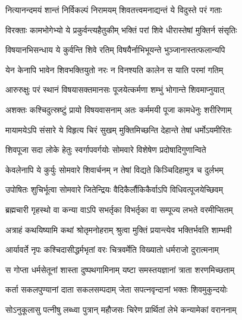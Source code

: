 \label{sec:somvara_vratha_katha}

\begin{center}


\twolineshloka
{नित्यानन्दमयं शान्तं निर्विकल्पं निरामयम्}
{शिवतत्त्वमनाद्यन्तं ये विदुस्ते परं गताः} %

\twolineshloka
{विरक्ताः कामभोगेभ्यो ये प्रकुर्वन्त्यहैतुकीम्}
{भक्तिं परां शिवे धीरास्तेषां मुक्तिर्न संसृतिः} %

\twolineshloka
{विषयानभिसन्धाय ये कुर्वन्ति शिवे रतिम्}
{विषयैर्नाभिभूयन्ते भुञ्जानास्तत्फलान्यपि} %

\twolineshloka
{येन केनापि भावेन शिवभक्तियुतो नरः}
{न विनश्यति कालेन स याति परमां गतिम्} %

\twolineshloka
{आरुरुक्षुः परं स्थानं विषयासक्तमानसः}
{पूजयेत्कर्मणा शम्भुं भोगान्ते शिवमाप्नुयात्} %

\twolineshloka
{अशक्तः कश्चिदुत्स्रष्टुं प्रायो विषयवासनाम्}
{अतः कर्ममयी पूजा कामधेनुः शरीरिणाम्} %

\twolineshloka
{मायामयेऽपि संसारे ये विहृत्य चिरं सुखम्}
{मुक्तिमिच्छन्ति देहान्ते तेषां धर्मोऽयमीरितः} %

\twolineshloka
{शिवपूजा सदा लोके हेतुः स्वर्गापवर्गयोः}
{सोमवारे विशेषेण प्रदोषादिगुणान्विते} %

\twolineshloka
{केवलेनापि ये कुर्युः सोमवारे शिवार्चनम्}
{न तेषां विद्यते किञ्चिदिहामुत्र च दुर्लभम्} %

\twolineshloka
{उपोषितः शुचिर्भूत्वा सोमवारे जितेन्द्रियः}
{वैदिकैर्लौकिकैर्वाऽपि विधिवत्पूजयेच्छिवम्} %

\twolineshloka
{ब्रह्मचारी गृहस्थो वा कन्या वाऽपि सभर्तृका}
{विभर्तृका वा सम्पूज्य लभते वरमीप्सितम्} %

\twolineshloka
{अत्राहं कथयिष्यामि कथां श्रोतृमनोहराम्}
{श्रुत्वा मुक्तिं प्रयान्त्येव भक्तिर्भवति शाम्भवी} %

\twolineshloka
{आर्यावर्ते नृपः कश्चिदासीद्धर्मभृतां वरः}
{चित्रवर्मेति विख्यातो धर्मराजो दुरात्मनाम्} %

\twolineshloka
{स गोप्ता धर्मसेतूनां शास्ता दुष्पथगामिनाम्}
{यष्टा समस्तयज्ञानां त्राता शरणमिच्छताम्} %

\twolineshloka
{कर्ता सकलपुण्यानां दाता सकलसम्पदाम्}
{जेता सपत्नवृन्दानां भक्तः शिवमुकुन्दयोः} %

\twolineshloka
{सोऽनुकूलासु पत्नीषु लब्ध्वा पुत्रान् महौजसः}
{चिरेण प्रार्थितां लेभे कन्यामेकां वराननाम्} %


\end{center}

